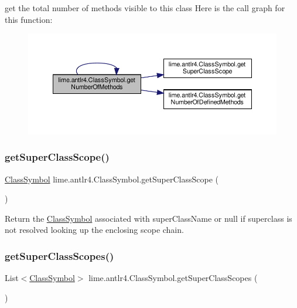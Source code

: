 get the total number of methods visible to this class Here is the call graph for this function\+:
\nopagebreak
\begin{figure}[H]
\begin{center}
\leavevmode
\includegraphics[width=350pt]{classlime_1_1antlr4_1_1ClassSymbol_a3f6bef449ae63455b81793f897a0c7e9_cgraph}
\end{center}
\end{figure}
\mbox{\label{classlime_1_1antlr4_1_1ClassSymbol_a9f660dd54d7ab8643fb885669adad106}} 
\subsubsection{\texorpdfstring{get\+Super\+Class\+Scope()}{getSuperClassScope()}}
{\footnotesize\ttfamily \hyperlink{classlime_1_1antlr4_1_1ClassSymbol}{Class\+Symbol} lime.\+antlr4.\+Class\+Symbol.\+get\+Super\+Class\+Scope (\begin{DoxyParamCaption}{ }\end{DoxyParamCaption})}

Return the \hyperlink{classlime_1_1antlr4_1_1ClassSymbol}{Class\+Symbol} associated with super\+Class\+Name or null if superclass is not resolved looking up the enclosing scope chain. \mbox{\label{classlime_1_1antlr4_1_1ClassSymbol_a6505cf7d9bbc2b32620eab9e20ddb881}} 
\subsubsection{\texorpdfstring{get\+Super\+Class\+Scopes()}{getSuperClassScopes()}}
{\footnotesize\ttfamily List$<$\hyperlink{classlime_1_1antlr4_1_1ClassSymbol}{Class\+Symbol}$>$ lime.\+antlr4.\+Class\+Symbol.\+get\+Super\+Class\+Scopes (\begin{DoxyParamCaption}{ }\end{DoxyParamCaption})}


